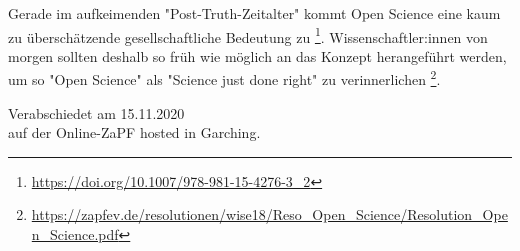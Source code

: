 \documentclass[DIV=calc]{scrartcl}
\begin{document}
Gerade im aufkeimenden "Post-Truth-Zeitalter" kommt Open Science eine kaum zu überschätzende gesellschaftliche Bedeutung zu \footnote{\url{https://doi.org/10.1007/978-981-15-4276-3_2}}. 
Wissenschaftler:innen von morgen sollten deshalb so früh wie möglich an das Konzept herangeführt werden, um so "Open Science" als "Science just done right" zu verinnerlichen \footnote{\url{https://zapfev.de/resolutionen/wise18/Reso_Open_Science/Resolution_Open_Science.pdf}}.

\vfill
    \begin{flushright}
      Verabschiedet am 15.11.2020 \\auf der Online-ZaPF hosted in Garching.
    \end{flushright}
\end{document}
